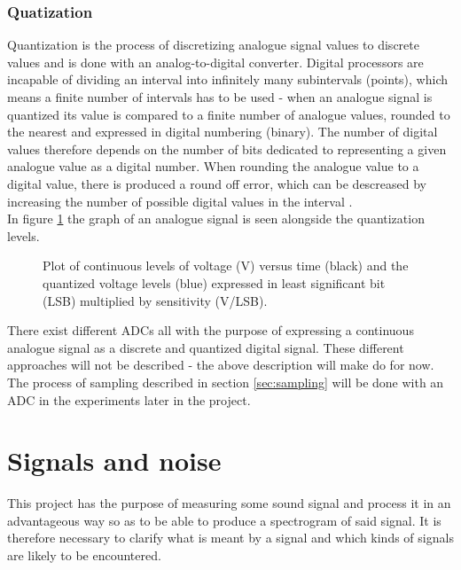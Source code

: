 \subsubsection{Quatization}
Quantization is the process of discretizing analogue signal values to discrete values and is done with an analog-to-digital converter. Digital processors are incapable of dividing an interval into infinitely many subintervals (points), which means a finite number of intervals has to be used -  when an analogue signal is quantized its value is compared to a finite number of analogue values, rounded to the nearest and expressed in digital numbering (binary). The number of digital values therefore depends on the number of bits dedicated to representing a given analogue value as a digital number. When rounding the analogue value to a digital value, there is produced a round off error, which can be descreased by increasing the number of possible digital values in the interval \cite{pelgrom}.\\
In figure \ref{fig:quant} the graph of an analogue signal is seen alongside the quantization levels.
\begin{figure}[H]
\centering
{}
\caption{Plot of continuous levels of voltage (V) versus time (black) and the quantized voltage levels (blue) expressed in least significant bit (LSB) multiplied by sensitivity (V/LSB).}
\label{fig:quant}
\end{figure}
\noindent There exist different ADCs \cite{pelgrom} all with the purpose of expressing a continuous analogue signal as a discrete and quantized digital signal. These different approaches will  not be described - the above description will make do for now. The process of sampling described in section \ref{sec:sampling} will be done with an ADC in the experiments later in the project.

\clearpage
\section{Signals and noise}
This project has the purpose of measuring some sound signal and process it in an advantageous way so as to be able to produce a spectrogram of said signal. It is therefore necessary to clarify what is meant by a signal and which kinds of signals are likely to be encountered.
